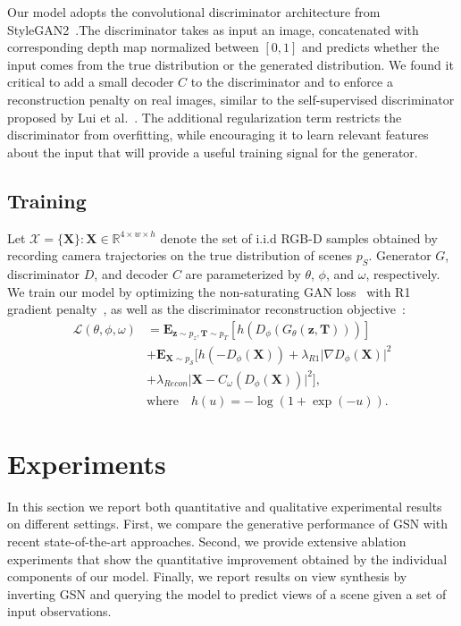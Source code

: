 \documentclass[10pt,twocolumn,letterpaper]{article}
\begin{document}
Our model adopts the convolutional discriminator architecture from StyleGAN2~\cite{stylegan2}.The discriminator takes as input an image, concatenated with corresponding depth map normalized between $[0, 1]$ 
and predicts whether the input comes from the true distribution or the generated distribution. We found it critical to add a small decoder $C$ to the discriminator and to enforce a reconstruction penalty on real images, similar to the self-supervised discriminator proposed by Lui et al.~\cite{self_supervised_discriminator}. The additional regularization term restricts the discriminator from overfitting, while encouraging it to learn relevant features about the input that will provide a useful training signal for the generator.

\subsection{Training}

Let $\mathcal{X} = \{\textbf{X}\}: \textbf{X} \in \mathbb{R}^{4 \times w \times h}$ denote the set of  i.i.d RGB-D samples obtained by recording camera trajectories on the true distribution of scenes $p_S$. Generator $G$, discriminator $D$, and decoder $C$ are parameterized by $\theta$, $\phi$, and $\omega$, respectively.  We train our model by optimizing the non-saturating GAN loss~\cite{gan} with R1 gradient penalty~\cite{r1}, as well as the discriminator reconstruction objective~\cite{self_supervised_discriminator}: 
\newcommand{\generator}{G_{\theta}}
\newcommand{\discriminator}{D_{\phi}}
\newcommand{\decoder}{C_{\omega}}
\begin{equation}
\begin{split}
\mathcal{L}(\theta, \phi, \omega) & = \mathbf{E}_{\mathbf{z}\sim p_z, \textbf{T}\sim p_T}[h(\discriminator(\generator(\mathbf{z}, \textbf{T})))]
\\
& + \mathbf{E}_{\mathbf{X}\sim p_\mathcal{S}}[h(-\discriminator(\mathbf{X})) + \lambda_{R1} \lvert \nabla \discriminator (\mathbf{X}) \rvert ^ 2 
\\
& + \lambda_{Recon} \lvert \mathbf{X} - \decoder(\discriminator(\mathbf{X}))  \rvert ^ 2] ,
\\
& \text{where} \quad h(u) = -\log(1 + \exp(-u)).
\end{split}
\end{equation}

\section{Experiments} \label{sect:experiments}
In this section we report both quantitative and qualitative experimental results on different settings. First, we compare the generative performance of GSN with recent state-of-the-art approaches. Second, we provide extensive ablation experiments that show the quantitative improvement obtained by the individual components of our model. Finally, we report results on view synthesis by inverting GSN and querying the model to predict views of a scene given a set of input observations. 
\end{document}
